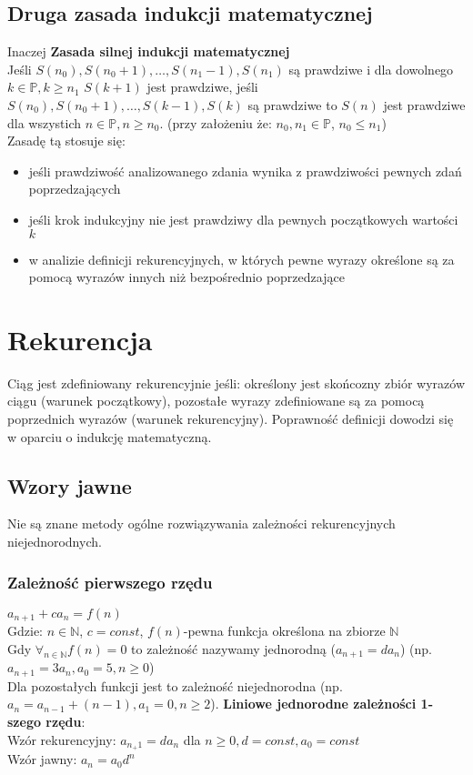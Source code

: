 \documentclass[a4paper,12pt]{article}
\begin{document}
\subsection{Druga zasada indukcji matematycznej}
Inaczej \textbf{Zasada silnej indukcji matematycznej} \\
Jeśli $S(n_0), S(n_0+1), \dots ,S(n_1-1), S(n_1)$ są prawdziwe i dla dowolnego $k\in\mathbb{P}, k\geq n_1$ $S(k+1)$ jest prawdziwe, jeśli $S(n_0), S(n_0+1), \dots ,S(k-1), S(k)$ są prawdziwe to $S(n)$ jest prawdziwe dla wszystich $n \in\mathbb{P}, n\geq n_0$. (przy założeniu że: $n_0, n_1 \in\mathbb{P}$, $n_0\leq n_1$) \\
Zasadę tą stosuje się:
\begin{itemize}\itemsep1pt \parskip0pt 
 \item jeśli prawdziwość analizowanego zdania wynika z prawdziwości pewnych zdań poprzedzających
 \item jeśli krok indukcyjny nie jest prawdziwy dla pewnych początkowych wartości $k$
 \item w analizie definicji rekurencyjnych, w których pewne wyrazy określone są za pomocą wyrazów innych niż bezpośrednio poprzedzające
\end{itemize}

\section{Rekurencja}
Ciąg jest zdefiniowany rekurencyjnie jeśli: określony jest skońcozny zbiór wyrazów ciągu (warunek początkowy), pozostałe wyrazy zdefiniowane są za pomocą poprzednich wyrazów (warunek rekurencyjny). Poprawność definicji dowodzi się w oparciu o indukcję matematyczną.
\subsection{Wzory jawne}
Nie są znane metody ogólne rozwiązywania zależności rekurencyjnych niejednorodnych.
\subsubsection{Zależność pierwszego rzędu}
$a_{n+1}+ca_n=f(n)$ \\
Gdzie: $n\in\mathbb{N}$, $c=const$, $f(n)$-pewna funkcja określona na zbiorze $\mathbb{N}$\\
Gdy $\forall_{n \in\mathbb{N}}f(n)=0$ to zależność nazywamy jednorodną ($a_{n+1}=da_n$) (np. $a_{n+1}=3a_n,  a_0=5, n\geq0$) \\
Dla pozostałych funkcji jest to zależność niejednorodna (np. $a_n=a_{n-1}+(n-1), a_1=0, n\geq2$).
\textbf{Liniowe jednorodne zależności 1-szego rzędu}: \\
Wzór rekurencyjny: $a_{n_+1}=da_n$ dla $n\geq0, d=const, a_0=const$ \\
Wzór jawny: $a_n=a_0d^n$
\end{document}
